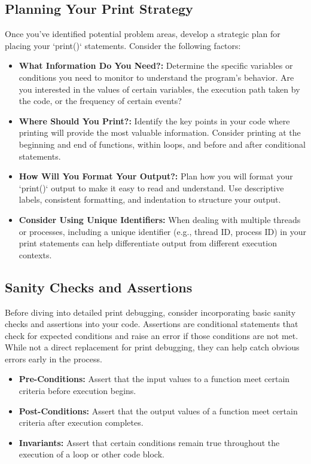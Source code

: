\documentclass{article}
\begin{document}
\subsection*{Planning Your Print Strategy}

Once you've identified potential problem areas, develop a strategic plan for placing your `print()` statements. Consider the following factors:

\begin{itemize}
    \item \textbf{What Information Do You Need?:} Determine the specific variables or conditions you need to monitor to understand the program's behavior. Are you interested in the values of certain variables, the execution path taken by the code, or the frequency of certain events?
    \item \textbf{Where Should You Print?:} Identify the key points in your code where printing will provide the most valuable information. Consider printing at the beginning and end of functions, within loops, and before and after conditional statements.
    \item \textbf{How Will You Format Your Output?:} Plan how you will format your `print()` output to make it easy to read and understand. Use descriptive labels, consistent formatting, and indentation to structure your output.
    \item \textbf{Consider Using Unique Identifiers:} When dealing with multiple threads or processes, including a unique identifier (e.g., thread ID, process ID) in your print statements can help differentiate output from different execution contexts.
\end{itemize}

\subsection*{Sanity Checks and Assertions}

Before diving into detailed print debugging, consider incorporating basic sanity checks and assertions into your code. Assertions are conditional statements that check for expected conditions and raise an error if those conditions are not met. While not a direct replacement for print debugging, they can help catch obvious errors early in the process.

\begin{itemize}
    \item \textbf{Pre-Conditions:} Assert that the input values to a function meet certain criteria before execution begins.
    \item \textbf{Post-Conditions:} Assert that the output values of a function meet certain criteria after execution completes.
    \item \textbf{Invariants:} Assert that certain conditions remain true throughout the execution of a loop or other code block.
\end{itemize}
\end{document}
